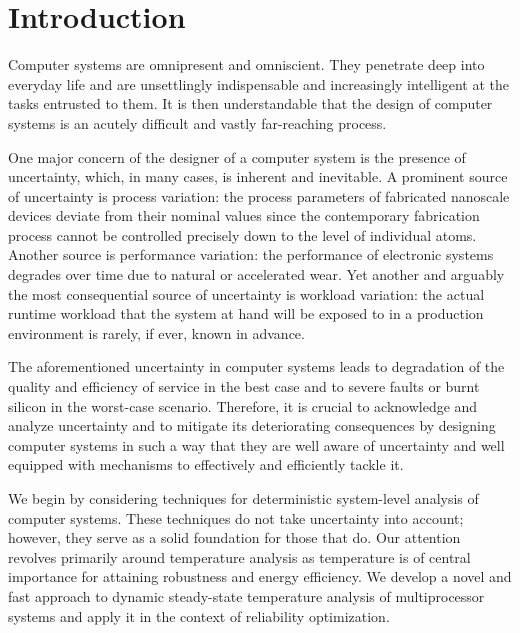 \chapter{Introduction}

Computer systems are omnipresent and omniscient. They penetrate deep into
everyday life and are unsettlingly indispensable and increasingly intelligent at
the tasks entrusted to them. It is then understandable that the design of
computer systems is an acutely difficult and vastly far-reaching process.

One major concern of the designer of a computer system is the presence of
uncertainty, which, in many cases, is inherent and inevitable. A prominent
source of uncertainty is process variation: the process parameters of fabricated
nanoscale devices deviate from their nominal values since the contemporary
fabrication process cannot be controlled precisely down to the level of
individual atoms. Another source is performance variation: the performance of
electronic systems degrades over time due to natural or accelerated wear. Yet
another and arguably the most consequential source of uncertainty is workload
variation: the actual runtime workload that the system at hand will be exposed
to in a production environment is rarely, if ever, known in advance.

The aforementioned uncertainty in computer systems leads to degradation of the
quality and efficiency of service in the best case and to severe faults or burnt
silicon in the worst-case scenario. Therefore, it is crucial to acknowledge and
analyze uncertainty and to mitigate its deteriorating consequences by designing
computer systems in such a way that they are well aware of uncertainty and well
equipped with mechanisms to effectively and efficiently tackle it.

We begin by considering techniques for deterministic system-level analysis of
computer systems. These techniques do not take uncertainty into account;
however, they serve as a solid foundation for those that do. Our attention
revolves primarily around temperature analysis as temperature is of central
importance for attaining robustness and energy efficiency. We develop a novel
and fast approach to dynamic steady-state temperature analysis of multiprocessor
systems and apply it in the context of reliability optimization.

